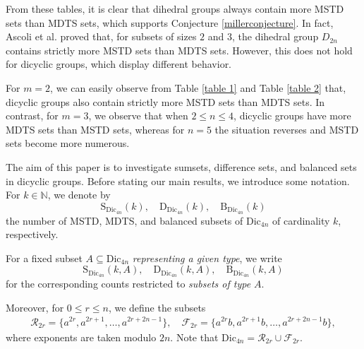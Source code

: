 \documentclass[11pt,reqno]{amsart}
\numberwithin{equation}{section}
\begin{document}
From these tables, it is clear that dihedral groups always contain more MSTD sets than MDTS sets, which supports Conjecture \ref{millerconjecture}. In fact, Ascoli et al. \cite{Ascoli et al_2022} proved that, for subsets of sizes $2$ and $3$, the dihedral group $D_{2n}$ contains strictly more MSTD sets than MDTS sets. However, this does not hold for dicyclic groups, which display different behavior.\par
For $m=2$, we can easily observe from  Table \ref{table 1} and Table \ref{table 2} that, dicyclic groups also contain strictly more MSTD sets than MDTS sets. In contrast, for $m=3$, we observe that when $2 \leq n \leq 4$, dicyclic groups have more MDTS sets than MSTD sets, whereas for $n=5$ the situation reverses and MSTD sets become more numerous. 
 
The aim of this paper is to investigate sumsets, difference sets, and balanced sets in dicyclic groups. Before stating our main results, we introduce some notation. 
For $k \in \mathbb{N}$, we denote by
$$
\mathrm{S}_{\mathrm{Dic}_{4n}}(k), \quad \mathrm{D}_{\mathrm{Dic}_{4n}}(k), \quad \mathrm{B}_{\mathrm{Dic}_{4n}}(k)
$$
the number of MSTD, MDTS, and balanced subsets of $\mathrm{Dic}_{4n}$ of cardinality $k$, respectively.

For a fixed subset $A \subseteq \mathrm{Dic}_{4n}$ \textit{representing a given type}, we write
$$
\mathrm{S}_{\mathrm{Dic}_{4n}}(k,A), \quad \mathrm{D}_{\mathrm{Dic}_{4n}}(k,A), \quad \mathrm{B}_{\mathrm{Dic}_{4n}}(k,A)
$$
for the corresponding counts restricted to \textit{subsets of type $A$}.

Moreover, for $0 \leq r \leq n$, we define the subsets
\begin{align*}
\mathcal{R}_{2r} = \{a^{2r}, a^{2r+1}, \dots, a^{2r+2n-1}\}, \quad \mathcal{F}_{2r} = \{a^{2r}b, a^{2r+1}b, \dots, a^{2r+2n-1}b\},
\end{align*}
where exponents are taken modulo $2n$. Note that $\mathrm{Dic}_{4n} = \mathcal{R}_{2r} \cup \mathcal{F}_{2r}$.
\end{document}
